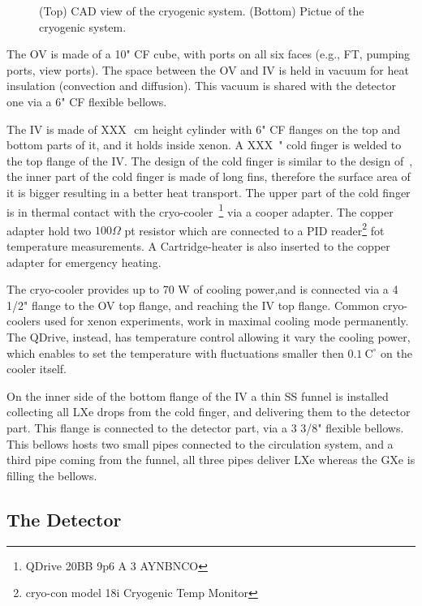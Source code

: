 \begin{figure}
\begin{subfigure}[b]{0.25\textheight}
    \end{subfigure}
        \caption{(Top) CAD view of the cryogenic system. (Bottom) Pictue of the cryogenic system. \label{fig:cryo}}
\end{figure}


The OV is made of a 10" CF cube, with ports on all six faces (e.g., FT, pumping ports, view ports). The space between the OV and IV is held in vacuum for heat insulation (convection and diffusion). This vacuum is shared with the detector one via a 6" CF flexible bellows.

The IV is made of XXX~\,cm height cylinder with 6" CF flanges on the top and bottom parts of it, and it holds inside xenon. A XXX~" cold finger is welded to the top flange of the IV. The design of the cold finger is similar to the design of~\cite{xe100_instr2012}, the inner part of the cold finger is made of long fins, therefore the surface area of it is bigger resulting in a better heat transport. The upper part of the cold finger is in thermal contact with the cryo-cooler~\footnote{QDrive 20BB 9p6 A 3 AYNBNCO} via a cooper adapter. The copper adapter hold two $100\Omega$ pt resistor which are connected to a PID reader\footnote{cryo-con model 18i Cryogenic Temp Monitor} fot temperature measurements. A Cartridge-heater is also inserted to the copper adapter for emergency heating. 

The cryo-cooler provides up to 70 W of cooling power,and is connected via a 4 1/2" flange to the OV top flange, and reaching the IV top flange. Common cryo-coolers used for xenon experiments, work in maximal cooling mode permanently. The QDrive, instead, has temperature control allowing it vary the cooling power, which enables to set the temperature with fluctuations smaller then $0.1~\mathrm{C^{\circ}}$ on the cooler itself.

On the inner side of the bottom flange of the IV a thin SS funnel is installed collecting all LXe drops from the cold finger, and delivering them to the  detector part. This flange is connected to the detector part, via a 3 3/8" flexible bellows. This bellows hosts two small pipes connected to the circulation system, and a third pipe coming from the funnel, all three pipes deliver LXe whereas the GXe is filling the bellows.

      


\subsection{The Detector}
\label{subsec:det}
